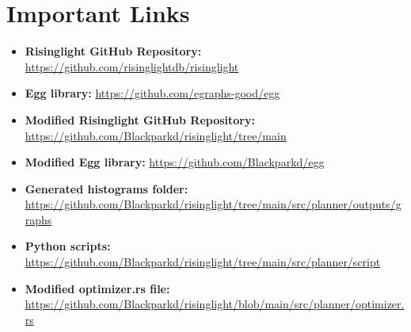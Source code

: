 \documentclass[a4paper,12pt]{scrreprt}
\begin{document}
\section{Important Links}
\begin{itemize}
    \item \textbf{Risinglight GitHub Repository:} \url{https://github.com/risinglightdb/risinglight}
    \item \textbf{Egg library:} \url{https://github.com/egraphs-good/egg}
    \item \textbf{Modified Risinglight GitHub Repository:} \url{https://github.com/Blackparkd/risinglight/tree/main}
    \item \textbf{Modified Egg library:} \url{https://github.com/Blackparkd/egg}
    \item \textbf{Generated histograms folder:} \url{https://github.com/Blackparkd/risinglight/tree/main/src/planner/outputs/graphs}
    \item \textbf{Python scripts:} \url{https://github.com/Blackparkd/risinglight/tree/main/src/planner/script}
    \item \textbf{Modified optimizer.rs file:} \url{https://github.com/Blackparkd/risinglight/blob/main/src/planner/optimizer.rs}
\end{itemize}
\end{document}
